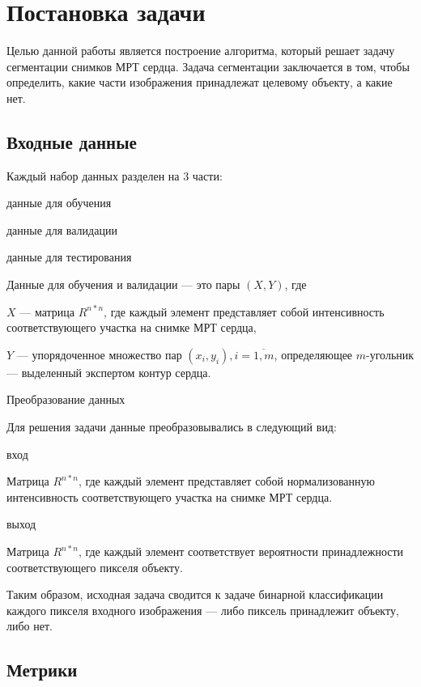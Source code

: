 \section{Постановка задачи}

Целью данной работы является построение алгоритма, который решает задачу сегментации снимков МРТ сердца. Задача сегментации заключается в том, чтобы определить, какие части изображения принадлежат целевому объекту, а какие нет. 

\subsection{Входные данные}

Каждый набор данных разделен на 3 части: 

\begin{itemsize}
  \item данные для обучения
  \item данные для валидации
  \item данные для тестирования
\end{itemsize}

Данные для обучения и валидации — это пары $(X,Y)$, где

  $X$ — матрица $R^{n*n}$, где каждый элемент представляет собой интенсивность соответствующего участка на снимке МРТ сердца,
  
  $Y$ — упорядоченное множество пар $(x_i,y_i), i = \overline{1,m}$, определяющее $m$-угольник — выделенный экспертом контур сердца.

Преобразование данных

Для решения задачи данные преобразовывались в следующий вид:

вход

Матрица $R^{n*n}$, где каждый элемент представляет собой нормализованную интенсивность соответствующего участка на снимке МРТ сердца.

выход

Матрица $R^{n*n}$, где каждый элемент соответствует вероятности принадлежности соответствующего пикселя объекту. 

Таким образом, исходная задача сводится к задаче бинарной классификации каждого пикселя входного изображения — либо пиксель принадлежит объекту, либо нет.

\subsection{Метрики}

